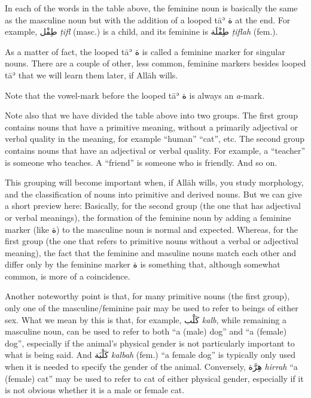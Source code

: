 \documentclass[
  10pt,
]{book}
\begin{document}
In each of the words in the table above, the feminine noun is basically the same as the masculine noun but with the addition of a looped tāʾ \foreignlanguage{arabic}{ة} at the end. For example,
\foreignlanguage{arabic}{طِفْل} \emph{ṭifl} (masc.) is a child, and its feminine is
\foreignlanguage{arabic}{طِفْلَة} \emph{ṭiflah} (fem.).

As a matter of fact, the looped tāʾ \foreignlanguage{arabic}{ة} is called a feminine marker for singular nouns. There are a couple of other, less common, feminine markers besides looped tāʾ that we will learn them later, if Allāh wills.

Note that the vowel-mark before the looped tāʾ \foreignlanguage{arabic}{ة} is always an \emph{a}-mark.

Note also that we have divided the table above into two groups. The first group contains nouns that have a primitive meaning, without a primarily adjectival or verbal quality in the meaning, for example \enquote{human} \enquote{cat}, etc.
The second group contains nouns that have an adjectival or verbal quality. For example, a \enquote{teacher} is someone who teaches. A \enquote{friend} is someone who is friendly. And so on.

This grouping will become important when, if Allāh wills, you study morphology, and the classification of nouns into primitive and derived nouns. But we can give a short preview here: Basically, for the second group (the one that has adjectival or verbal meanings), the formation of the feminine noun by adding a feminine marker (like \foreignlanguage{arabic}{ة}) to the masculine noun is normal and expected. Whereas, for the first group (the one that refers to primitive nouns without a verbal or adjectival meaning), the fact that the feminine and masuline nouns match each other and differ only by the feminine marker \foreignlanguage{arabic}{ة} is something that, although somewhat common, is more of a coincidence.

Another noteworthy point is that, for many primitive nouns (the first group), only one of the masculine/feminine pair may be used to refer to beings of either sex. What we mean by this is that, for example,
\foreignlanguage{arabic}{کَلْب} \emph{kalb}, while remaining a masculine noun, can be used to refer to both \enquote{a (male) dog} and \enquote{a (female) dog}, especially if the animal's physical gender is not particularly important to what is being said.
And \foreignlanguage{arabic}{کَلْبَة} \emph{kalbah} (fem.) \enquote{a female dog} is typically only used when it is needed to specify the gender of the animal.
Conversely, \foreignlanguage{arabic}{هِرَّة} \emph{hirrah} \enquote{a (female) cat} may be used to refer to cat of either physical gender, especially if it is not obvious whether it is a male or female cat.
\end{document}
